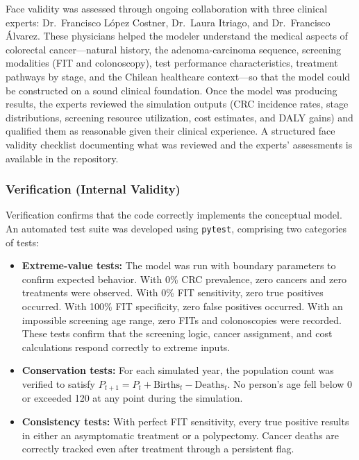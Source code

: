 \documentclass[sn-mathphys-num]{sn-jnl}%
\theoremstyle{thmstyleone}%
\theoremstyle{thmstyletwo}%
\theoremstyle{thmstylethree}%
\begin{document}
Face validity was assessed through ongoing collaboration with three clinical experts: Dr.\ Francisco L\'opez Costner, Dr.\ Laura Itriago, and Dr.\ Francisco \'Alvarez. These physicians helped the modeler understand the medical aspects of colorectal cancer---natural history, the adenoma-carcinoma sequence, screening modalities (FIT and colonoscopy), test performance characteristics, treatment pathways by stage, and the Chilean healthcare context---so that the model could be constructed on a sound clinical foundation. Once the model was producing results, the experts reviewed the simulation outputs (CRC incidence rates, stage distributions, screening resource utilization, cost estimates, and DALY gains) and qualified them as reasonable given their clinical experience. A structured face validity checklist documenting what was reviewed and the experts' assessments is available in the repository.

\subsubsection{Verification (Internal Validity)}

Verification confirms that the code correctly implements the conceptual model. An automated test suite was developed using \texttt{pytest}, comprising two categories of tests:

\begin{itemize}
    \item \textbf{Extreme-value tests:} The model was run with boundary parameters to confirm expected behavior. With 0\% CRC prevalence, zero cancers and zero treatments were observed. With 0\% FIT sensitivity, zero true positives occurred. With 100\% FIT specificity, zero false positives occurred. With an impossible screening age range, zero FITs and colonoscopies were recorded. These tests confirm that the screening logic, cancer assignment, and cost calculations respond correctly to extreme inputs.
    \item \textbf{Conservation tests:} For each simulated year, the population count was verified to satisfy $P_{t+1} = P_t + \text{Births}_t - \text{Deaths}_t$. No person's age fell below 0 or exceeded 120 at any point during the simulation.
    \item \textbf{Consistency tests:} With perfect FIT sensitivity, every true positive results in either an asymptomatic treatment or a polypectomy. Cancer deaths are correctly tracked even after treatment through a persistent flag.
\end{itemize}
\end{document}
